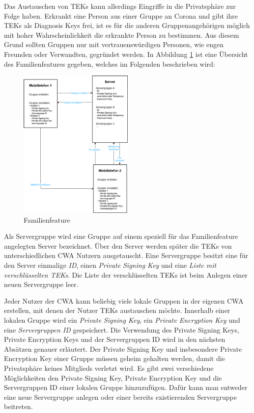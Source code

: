 \documentclass[conference,compsoc]{IEEEtran}
\begin{document}
Das Austauschen von TEKs kann allerdings Eingriffe in die Privatsphäre zur Folge haben.
Erkrankt eine Person aus einer Gruppe an Corona und gibt ihre TEKs als Diagnosis Keys frei, ist es für die anderen Gruppenangehörigen möglich mit hoher Wahrscheinlichkeit die erkrankte Person zu bestimmen.
Aus diesem Grund sollten Gruppen nur mit vertrauenswürdigen Personen, wie engen Freunden oder Verwandten, gegründet werden.
In Abbildung \ref{Familienfeature_Abbildung} ist eine Übersicht des Familienfeatures gegeben, welches im Folgenden beschrieben wird:

\begin{figure}[h]
	\centering
	\includegraphics[width=0.5\textwidth]{"Familiengruppe"}
	\caption{Familienfeature}
	\label{Familienfeature_Abbildung}
\end{figure}

Als Servergruppe wird eine Gruppe auf einem speziell für das Familienfeature angelegten Server bezeichnet.
Über den Server werden später die TEKs von unterschiedlichen CWA Nutzern ausgetauscht.
Eine Servergruppe besitzt eine für den Server einmalige \textit{ID}, einen \textit{Private Signing Key} und eine \textit{Liste mit verschlüsselten TEKs}.
Die Liste der verschlüsselten TEKs ist beim Anlegen einer neuen Servergruppe leer.

Jeder Nutzer der CWA kann beliebig viele lokale Gruppen in der eigenen CWA erstellen, mit denen der Nutzer TEKs austauschen möchte.
Innerhalb einer lokalen Gruppe wird ein \textit{Private Signing Key}, ein \textit{Private Encryption Key} und eine \textit{Servergruppen ID} gespeichert.
Die Verwendung des Private Signing Keys, Private Encryption Keys und der Servergruppen ID wird in den nächsten Absätzen genauer erläutert.
Der Private Signing Key und insbesondere Private Encryption Key einer Gruppe müssen geheim gehalten werden, damit die Privatsphäre keines Mitglieds verletzt wird.
Es gibt zwei verschiedene Möglichkeiten den Private Signing Key, Private Encryption Key und die Servergruppen ID einer lokalen Gruppe hinzuzufügen.
Dafür kann man entweder eine neue Servergruppe anlegen oder einer bereits existierenden Servergruppe beitreten.
\end{document}
